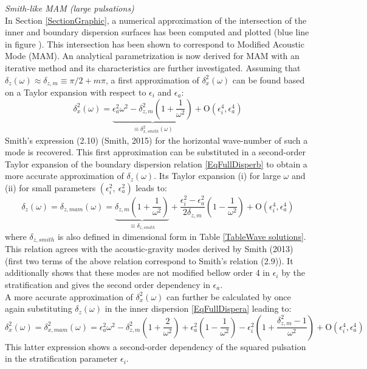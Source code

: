 \documentclass[a4paper,11pt]{article}
\begin{document}
\textit{Smith-like MAM (large pulsations)}\\
In Section \ref{SectionGraphic}, a numerical approximation of the intersection of the inner and boundary dispersion surfaces has been computed and plotted (blue line in figure ). This intersection has been shown to correspond to Modified Acoustic Mode (MAM). An analytical parametrization is now derived for MAM with an iterative method and its characteristics are further investigated. Assuming that $\delta_z(\omega)\approx\delta_{z,m} \equiv \pi/2+m\pi$, a first approximation of $\delta_x^2(\omega)$ can be found based on a Taylor expansion with respect to $\epsilon_i$ and $\epsilon_a$:
\begin{equation}
    \delta_{x}^2(\omega) = \underbrace{\epsilon_a^2\omega^2
    -\delta_{z,m}^2\left(1+\frac{1}{\omega^2}\right)}_{\equiv\delta_{x,smith}^2(\omega)}
    	+\mathrm{O}	(\epsilon_i^4,\epsilon_a^4)
\end{equation}
Smith's expression (2.10) (Smith, 2015) for the horizontal wave-number of such a mode is recovered. This first approximation can be substituted in a second-order Taylor expansion of the boundary dispersion relation \ref{EqFullDisperb} to obtain a more accurate approximation of $\delta_z(\omega)$. Its Taylor expansion (i) for large $\omega$ and (ii) for small parameters $(\epsilon_i^2,\ \epsilon_a^2)$ leads to:
\begin{equation}
	\delta_{z}(\omega)=\delta_{z,mam}(\omega) = 
	\underbrace{\delta_{z,m}\left(1+\frac{1}{\omega^2}\right)}_{\equiv\delta_{z,smith}}
	+\frac{\epsilon_i^2-\epsilon_a^2}{2\delta_{z,m}}\left(1-\frac{1}{\omega^2} \right)
	+\mathrm{O}	(\epsilon_i^4,\epsilon_a^4)
\end{equation}
where $\delta_{z,smith}$ is also defined in dimensional form in Table \ref{TableWave solutions}. This relation agrees with the acoustic-gravity modes derived by Smith (2013) (first two terms of the above relation correspond to Smith's relation (2.9)). It additionally shows that these modes are not modified bellow order 4 in $\epsilon_i$ by the stratification and gives the second order dependency in $\epsilon_a$.\\
A more accurate approximation of $\delta_x^2(\omega)$ can further be calculated by once again substituting $\delta_z(\omega)$ in the inner dispersion \ref{EqFullDispera} leading to:
\begin{equation}
	\delta_x^2(\omega)=\delta_{x,mam}^2(\omega) = \epsilon_a^2\omega^2
	-\delta_{z,m}^2\left(1+\frac{2}{\omega^2}\right)
	+\epsilon_a^2\left(1-\frac{1}{\omega^2}\right)
	-\epsilon_i^2\left(1+\frac{\delta_{z,m}^2-1}{\omega^2}\right)
	+\mathrm{O}	(\epsilon_i^4,\epsilon_a^4)
\end{equation}
This latter expression shows a second-order dependency of the squared pulsation in the stratification parameter $\epsilon_i$.\\
\end{document}
